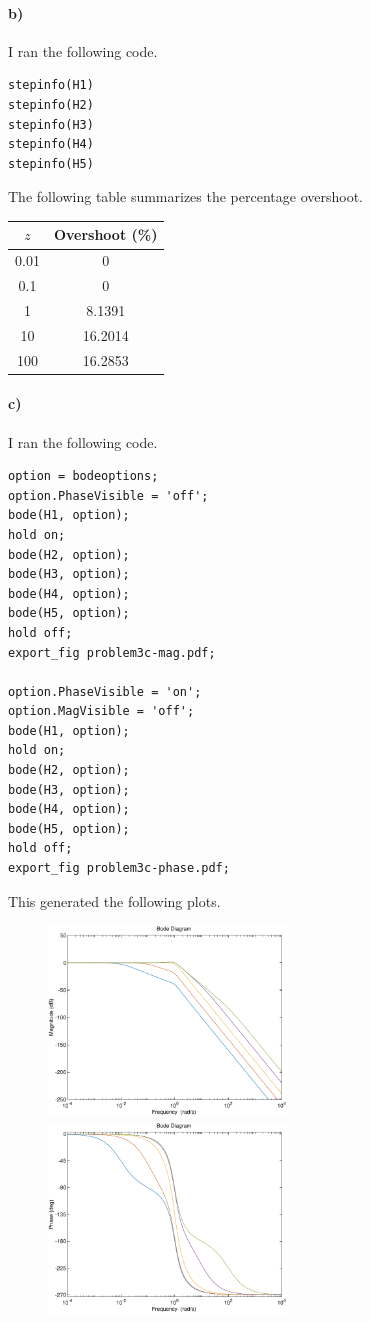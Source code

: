\documentclass[12pt]{article}
\begin{document}
\paragraph{b)}

I ran the following code.
\begin{verbatim}
stepinfo(H1)
stepinfo(H2)
stepinfo(H3)
stepinfo(H4)
stepinfo(H5)
\end{verbatim}
The following table summarizes the percentage overshoot.
\begin{center}
    \begin{tabular}{c|c}
        \(z\) & Overshoot (\%)\\
        \hline
        0.01 & 0\\
        0.1 & 0\\
        1 & 8.1391\\
        10 & 16.2014\\
        100 & 16.2853
    \end{tabular}
\end{center}

\paragraph{c)}

I ran the following code.
\begin{verbatim}
option = bodeoptions;
option.PhaseVisible = 'off';
bode(H1, option);
hold on;
bode(H2, option);
bode(H3, option);
bode(H4, option);
bode(H5, option);
hold off;
export_fig problem3c-mag.pdf;

option.PhaseVisible = 'on';
option.MagVisible = 'off';
bode(H1, option);
hold on;
bode(H2, option);
bode(H3, option);
bode(H4, option);
bode(H5, option);
hold off;
export_fig problem3c-phase.pdf;
\end{verbatim}
This generated the following plots.
\begin{figure}[H]
    \begin{center}
        \includegraphics[width=2.5in]{problem3c-mag.pdf}
        \includegraphics[width=2.5in]{problem3c-phase.pdf}
    \end{center}
\end{figure}
\end{document}
